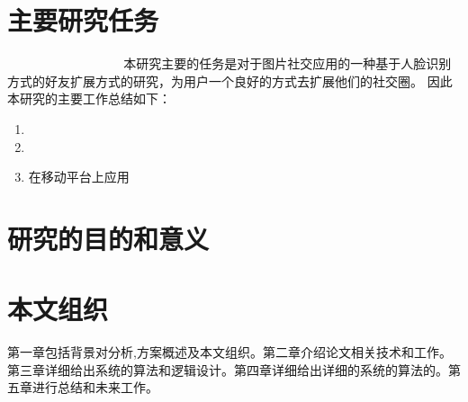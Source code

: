 \section{主要研究任务}
􏰉􏴳􏰭􏴴􏴵􏴶􏴷􏰿􏴸􏴹􏴘􏰏􏲦􏲜􏱲􏴺􏰭􏴻􏲆􏴻􏴼􏰏􏱦􏴷􏱜􏰒􏴽􏳯􏴾􏴿􏵀􏱾􏱜本研究主要的任务是对于图片社交应用的一种基于人脸识别方式的好友扩展方式的研究，为用户一个良好的方式去扩展他们的社交圈。
因此本研究的主要工作总结如下：
\begin{enumerate}
\item 
\item 
\item 在移动平台上应用

\end{enumerate}
\section{研究的目的和意义}
\section{本文组织}
第一章包括背景对分析,方案概述及本文组织。第二章介绍论文相关技术和工作。第三章详细给出系统的算法和逻辑设计。第四章详细给出详细的系统的算法的。第五章进行总结和未来工作。

